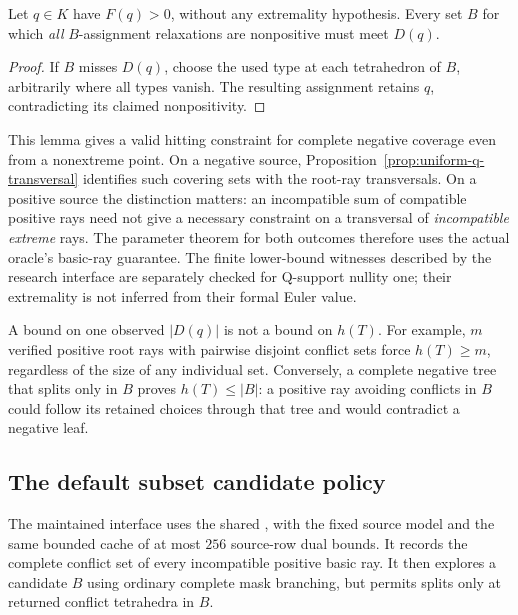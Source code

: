 \begin{lemma}
\label{lem:nonextreme-conflict-constraint}
Let $q\in K$ have $F(q)>0$, without any extremality hypothesis.  Every
set $B$ for which \emph{all} $B$-assignment relaxations are nonpositive
must meet $D(q)$.
\end{lemma}
\begin{proof}
If $B$ misses $D(q)$, choose the used type at each tetrahedron of $B$,
arbitrarily where all types vanish.  The resulting assignment retains
$q$, contradicting its claimed nonpositivity.
\end{proof}

This lemma gives a valid hitting constraint for complete negative
coverage even from a nonextreme point.  On a negative source,
Proposition~\ref{prop:uniform-q-transversal} identifies such covering
sets with the root-ray transversals.  On a positive source the distinction
matters: an incompatible sum of compatible positive rays need not give
a necessary constraint on a transversal of \emph{incompatible extreme}
rays.  The parameter theorem for both outcomes therefore uses the actual
oracle's basic-ray guarantee.  The finite lower-bound witnesses described
by the research interface are separately checked for Q-support nullity
one; their extremality is not inferred from their formal Euler value.

A bound on one observed $|D(q)|$ is not a bound on $h(T)$.  For example,
$m$ verified positive root rays with pairwise disjoint conflict sets force
$h(T)\ge m$, regardless of the size of any individual set.  Conversely,
a complete negative tree that splits only in $B$ proves $h(T)\le|B|$:
a positive ray avoiding conflicts in $B$ could follow its retained
choices through that tree and would contradict a negative leaf.

\subsection{The default subset candidate policy}

The maintained  interface uses the shared
, with the fixed source model and the same bounded
cache of at most $256$ source-row dual bounds.  It records the complete
conflict set of every incompatible positive basic ray.  It then explores
a candidate $B$ using ordinary complete mask branching, but permits
splits only at returned conflict tetrahedra in $B$.

